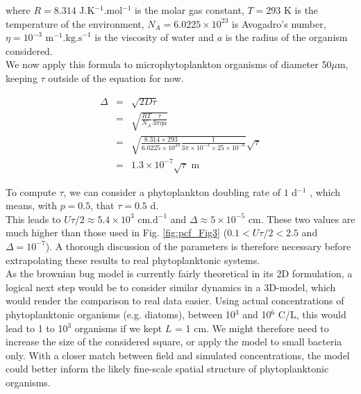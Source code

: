 where $R=8.314$ J.K$^{-1}$.mol$^{-1}$ is the molar gas constant, $T=293$ K is the temperature of the environment, $N_{A}=6.0225\times10^{23}$ is Avogadro's number, $\eta=10^{-3}\text{ m}^{-1}.\text{kg.s}^{-1}$ is the viscosity of water and $a$ is the radius of the organism considered.\\

We now apply this formula to microphytoplankton organisms of diameter 50$\mu$m, keeping $\tau$ outside of the equation for now.

\begin{eqnarray}
\Delta & = & \sqrt{2D\tau}\\
  &= & \sqrt{\frac{RT}{N_{A}}\frac{\tau}{3\pi\eta a}}\\
&=& \sqrt{\frac{8.314\times293}{6.0225\times10^{23}}\frac{1}{3\pi\times10^{-3}\times25\times10^{-6}}}\sqrt{\tau}\\
 & = & 1.3 \times 10^{-7} \sqrt{\tau} \text{ m}
\end{eqnarray}

To compute $\tau$, we can consider a phytoplankton doubling rate of $1$ d$^{-1}$ \citep{bissinger_predicting_2008}, which means, with $p=0.5$, that $\tau=0.5$ d.\\

This leads to $U\tau/2\approx 5.4\times10^{3} \text{ cm.d}^{-1}$ and $\Delta \approx 5\times10^{-5}$ cm. These two values are much higher than those used in Fig. \ref{fig:pcf_Fig3} ($0.1<U\tau/2<2.5$ and $\Delta=10^{-7}$). A thorough discussion of the parameters is therefore necessary before extrapolating these results to real phytoplanktonic systems. \\

As the brownian bug model is currently fairly theoretical in its 2D formulation, a logical next step would be to consider similar dynamics in a 3D-model, which would render the comparison to real data easier. Using actual concentrations of phytoplanktonic organisms (e.g. diatoms), between 10$^3$ and 10$^6$ C/L, this would lead to 1 to 10$^3$ organisms if we kept $L$ = 1 cm. We might therefore need to increase the size of the considered square, or apply the model to small bacteria only. With a closer match between field and simulated concentrations, the model could better inform the likely fine-scale spatial structure of phytoplanktonic organisms. 



